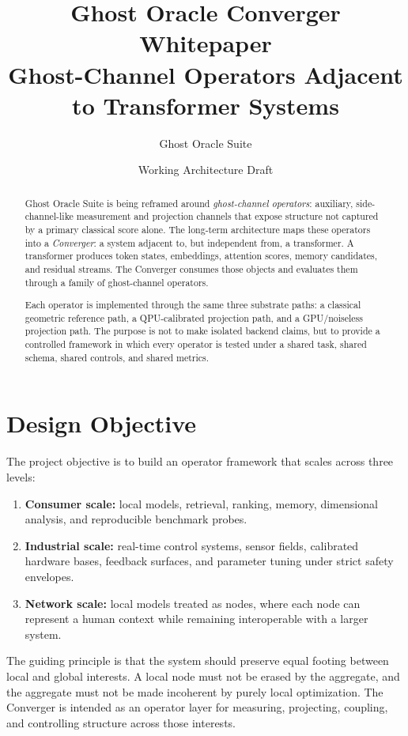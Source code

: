 \documentclass[11pt]{article}
\title{\textbf{Ghost Oracle Converger Whitepaper}\\
\large Ghost-Channel Operators Adjacent to Transformer Systems}
\author{Ghost Oracle Suite}
\date{Working Architecture Draft}
\begin{document}
\maketitle

\begin{abstract}
Ghost Oracle Suite is being reframed around \emph{ghost-channel operators}:
auxiliary, side-channel-like measurement and projection channels that expose
structure not captured by a primary classical score alone. The long-term
architecture maps these operators into a \emph{Converger}: a system adjacent to,
but independent from, a transformer. A transformer produces token states,
embeddings, attention scores, memory candidates, and residual streams. The
Converger consumes those objects and evaluates them through a family of
ghost-channel operators.

Each operator is implemented through the same three substrate paths:
a classical geometric reference path, a QPU-calibrated projection path, and a
GPU/noiseless projection path. The purpose is not to make isolated backend
claims, but to provide a controlled framework in which every operator is tested
under a shared task, shared schema, shared controls, and shared metrics.
\end{abstract}

\tableofcontents
\newpage

\section{Design Objective}

The project objective is to build an operator framework that scales across three
levels:
\begin{enumerate}
  \item \textbf{Consumer scale:} local models, retrieval, ranking, memory,
  dimensional analysis, and reproducible benchmark probes.
  \item \textbf{Industrial scale:} real-time control systems, sensor fields,
  calibrated hardware bases, feedback surfaces, and parameter tuning under
  strict safety envelopes.
  \item \textbf{Network scale:} local models treated as nodes, where each node
  can represent a human context while remaining interoperable with a larger
  system.
\end{enumerate}

The guiding principle is that the system should preserve equal footing between
local and global interests. A local node must not be erased by the aggregate, and
the aggregate must not be made incoherent by purely local optimization. The
Converger is intended as an operator layer for measuring, projecting, coupling,
and controlling structure across those interests.
\end{document}
